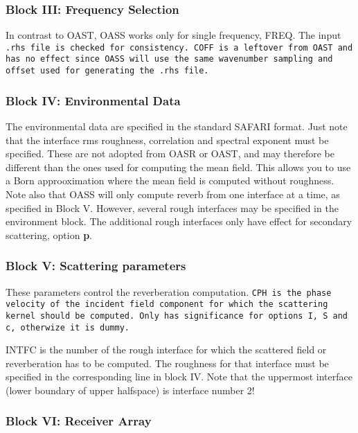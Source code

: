 \subsubsection{Block III: Frequency Selection}

In contrast to OAST, OASS works only for single frequency, FREQ. The
input \tt .rhs \rm file is checked for consistency. 
\tt COFF \rm is a leftover from OAST and has no effect since OASS will
use the same wavenumber sampling and offset  used for generating the
\tt .rhs \rm file.
 
\subsubsection{Block IV: Environmental Data }

The environmental data are specified in the standard SAFARI format.
Just note that the interface rms roughness, correlation and spectral exponent must be
specified. These are not adopted from OASR or OAST, and may therefore
be different than the ones used for computing the mean field. This
allows you to use a Born approoximation where the mean field is
computed without roughness. Note also that OASS will only compute
reverb from one interface at a time, as specified in Block V. However,
several rough interfaces may be specified in the environment block.
The additional rough interfaces only have effect for secondary
scattering, option {\bf p}.

\subsubsection{Block V: Scattering parameters}

These parameters control the reverberation computation. \tt CPH \rm is
the phase velocity of the incident field component for which  the
scattering kernel should be computed. Only has significance for
options \tt I, S and c, \rm otherwize it is dummy.

INTFC is the number of the rough interface for which the scattered
field or reverberation has to be computed. The roughness for that
interface must be specified in the corresponding line in block IV.
Note that the uppermost interface (lower boundary of upper halfspace)
is interface number 2! 


\subsubsection{Block VI: Receiver Array}

